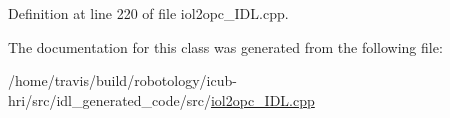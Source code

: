 Definition at line 220 of file iol2opc\+\_\+\+I\+D\+L.\+cpp.



The documentation for this class was generated from the following file\+:\begin{DoxyCompactItemize}
\item 
/home/travis/build/robotology/icub-\/hri/src/idl\+\_\+generated\+\_\+code/src/\hyperlink{iol2opc__IDL_8cpp}{iol2opc\+\_\+\+I\+D\+L.\+cpp}\end{DoxyCompactItemize}
